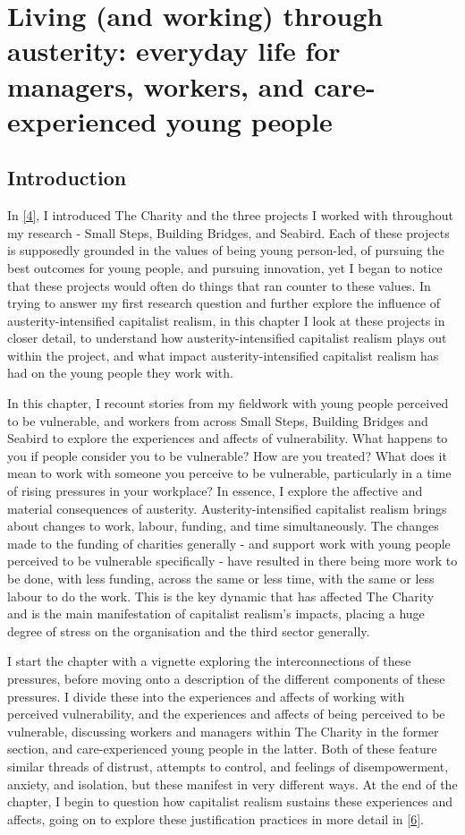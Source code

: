 \chapter{Living (and working) through austerity: everyday life for managers, workers, and care-experienced young people}
\label{5}

\section{Introduction}
\label{sec:}

In \ref{4}, I introduced The Charity and the three projects I worked with throughout my research - Small Steps, Building Bridges, and Seabird. Each of these projects is supposedly grounded in the values of being young person-led, of pursuing the best outcomes for young people, and pursuing innovation, yet I began to notice that these projects would often do things that ran counter to these values. In trying to answer my first research question and further explore the influence of austerity-intensified capitalist realism, in this chapter I look at these projects in closer detail, to understand how austerity-intensified capitalist realism plays out within the project, and what impact austerity-intensified capitalist realism has had on the young people they work with. 

In this chapter, I recount stories from my fieldwork with young people perceived to be vulnerable, and workers from across Small Steps, Building Bridges and Seabird to explore the experiences and affects of vulnerability. What happens to you if people consider you to be vulnerable? How are you treated? What does it mean to work with someone you perceive to be vulnerable, particularly in a time of rising pressures in your workplace? In essence, I explore the affective and material consequences of austerity. Austerity-intensified capitalist realism brings about changes to work, labour, funding, and time simultaneously. The changes made to the funding of charities generally - and support work with young people perceived to be vulnerable specifically - have resulted in there being more work to be done, with less funding, across the same or less time, with the same or less labour to do the work. This is the key dynamic that has affected The Charity and is the  main manifestation of capitalist realism’s impacts, placing a huge degree of stress on the organisation and the third sector generally. 

I start the chapter with a vignette exploring the interconnections of these pressures, before moving onto a description of the different components of these pressures. I divide these into the experiences and affects of working with perceived vulnerability, and the experiences and affects of being perceived to be vulnerable, discussing workers and managers within The Charity in the former section, and care-experienced young people in the latter. Both of these feature similar threads of distrust, attempts to control, and feelings of disempowerment, anxiety, and isolation, but these manifest in very different ways. At the end of the chapter, I begin to question how capitalist realism sustains these experiences and affects, going on to explore these justification practices in more detail in \ref{6}. 

